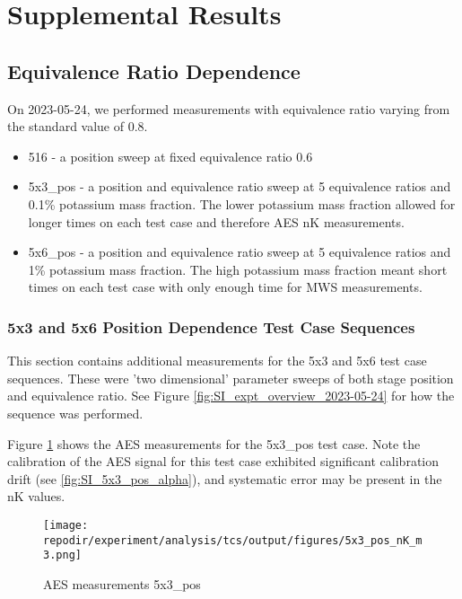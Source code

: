 \section{Supplemental Results}


\clearpage

\subsection{Equivalence Ratio Dependence}

On 2023-05-24, we performed measurements with equivalence ratio varying from the standard value of 0.8. 

\begin{itemize}
    \item 516 - a position sweep at fixed equivalence ratio 0.6
    \item 5x3\_pos - a position and equivalence ratio sweep at 5 equivalence ratios and 0.1\% potassium mass fraction. The lower potassium mass fraction allowed for longer times on each test case and therefore AES nK measurements. 
    \item 5x6\_pos - a position and equivalence ratio sweep at 5 equivalence ratios and 1\% potassium mass fraction. The high potassium mass fraction meant short times on each test case with only enough time for MWS measurements. 
\end{itemize}

\subsubsection{5x3 and 5x6 Position Dependence Test Case Sequences}

This section contains additional measurements for the 5x3 and 5x6 test case sequences. These were 'two dimensional' parameter sweeps of both stage position and equivalence ratio. See Figure \ref{fig:SI_expt_overview_2023-05-24} for how the sequence was performed. 

Figure \ref{fig:SI_5x3_pos_nK_m3} shows the AES measurements for the 5x3\_pos test case. Note the calibration of the AES signal for this test case exhibited significant calibration drift (see \ref{fig:SI_5x3_pos_alpha}), and systematic error may be present in the nK values. 

\begin{figure}[]
\centering
\texttt{[image: \\repodir/experiment/analysis/tcs/output/figures/5x3\_pos\_nK\_m3.png]}
\caption{AES measurements 5x3\_pos}
\label{fig:SI_5x3_pos_nK_m3}
\end{figure}

